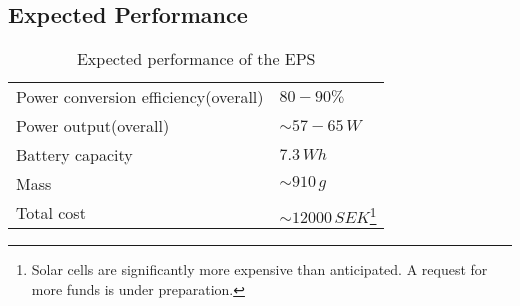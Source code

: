 \subsection{Expected Performance}
%
\begin{table}[H]
\centering
\caption{Expected performance of the \ac{EPS}}
\label{tab:expected_performance}
\begin{minipage}{\textwidth}
\begin{tabular}{p{}p{}}
\hline
Power conversion efficiency(overall) & $80-90\%$\\
Power output(overall) & $\sim 57-65\,W$\\
Battery capacity & $7.3\,Wh$\\
Mass & $\sim910\,g$\\
Total cost & $\sim12000\,SEK$\footnote{Solar cells are significantly more expensive than anticipated. A request for more funds is under preparation.}\\
\hline
\end{tabular}\par
\vspace{-0.75\skip\footins}
\renewcommand{\footnoterule}{}
\end{minipage}
\end{table}